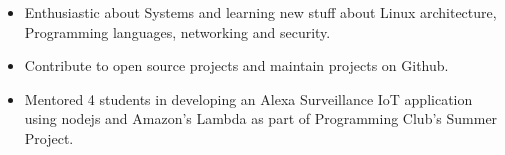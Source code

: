 



{\fontsize{11pt}{1em}\bodyfontlight\upshape\color{text}
\begin{itemize}
  \itemsep-0.3em
    \item Enthusiastic about Systems and learning new stuff about Linux architecture, Programming languages, networking and security.
    \item Contribute to open source projects and maintain projects on Github.
    \item Mentored 4 students in developing an Alexa Surveillance IoT application using nodejs and Amazon's Lambda as part of Programming Club's Summer Project.
\end{itemize}
}
